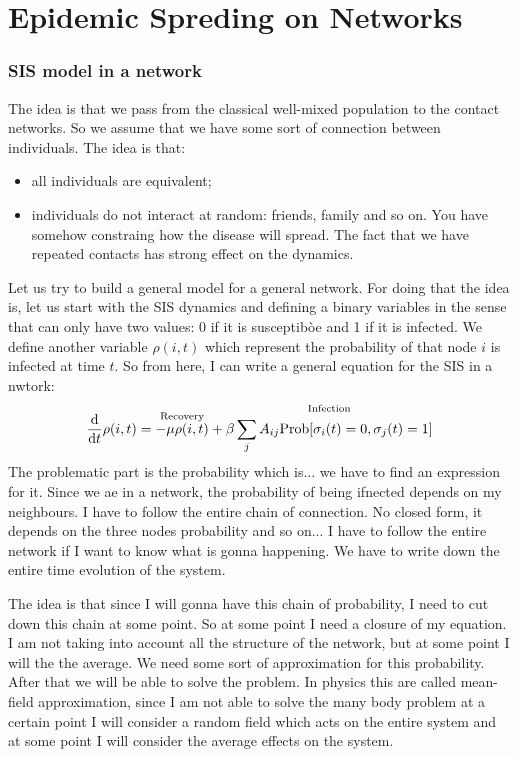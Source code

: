\documentclass[../main/main.tex]{subfiles}
\begin{document}
\chapter{Epidemic Spreding on Networks}

\subsection{SIS model in a network}

The idea is that we pass from the classical well-mixed population to the contact networks. So we assume that we have some sort of connection between individuals. The idea is that:
\begin{itemize}
\item all individuals are equivalent;
\item individuals do not interact at random: friends, family and so on. You have somehow constraing how the disease will spread. The fact that we have repeated contacts has strong effect on the dynamics.
\end{itemize}
Let us try to build a general model for a general network. For doing that the idea is, let us start with the SIS dynamics and defining a binary variables in the sense that can only have two values: 0 if it is susceptibòe and 1 if it is infected. We define another variable \( \rho (i,t) \) which represent the probability of that node \( i \) is infected at time \( t \). So from here, I can write a general equation for the SIS in a nwtork:
\begin{equation*}
  \dv{}{t} \rho (i,t) = \overset{\text{Recovery}}{- \mu  \rho (i,t)} + \overset{\text{Infection}}{\beta \sum_{j}^{} A_{ij} \text{Prob} [\sigma _i (t) = 0, \sigma _j (t ) =1 ]   }
\end{equation*}
The problematic part is the probability which is... we have to find an expression for it. Since we ae in a network, the probability of being ifnected depends on my neighbours. I have to follow the entire chain of connection. No closed form, it depends on the three nodes probability and so on... I have to follow the entire network if I want to know what is gonna happening.
We have to write down the entire time evolution of the system.

The idea is that since I will gonna have this chain of probability, I need to cut down this chain at some point. So at some point I need a closure of my equation. I am not taking into account all the structure of the network, but at some point I will the the average. We need some sort of approximation for this probability. After that we will be able to solve the problem.
In physics this are called mean-field approximation, since I am not able to solve the many body problem at a certain point I will consider a random field which acts on the entire system and at some point I will consider the average effects on the system.
\end{document}
